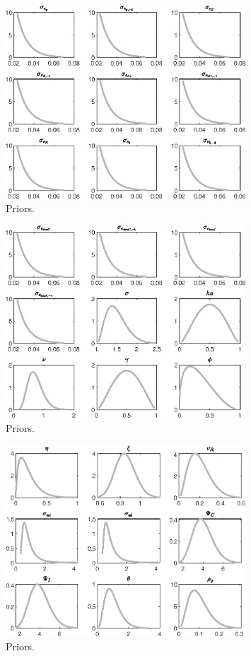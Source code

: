  
\begin{figure}[H]
\centering
\includegraphics[width=0.80\textwidth]{BRS_sectoral_KK/graphs/BRS_sectoral_KK_Priors1}
\caption{Priors.}\label{Fig:Priors:1}
\end{figure}
\begin{figure}[H]
\centering
\includegraphics[width=0.80\textwidth]{BRS_sectoral_KK/graphs/BRS_sectoral_KK_Priors2}
\caption{Priors.}\label{Fig:Priors:2}
\end{figure}
\begin{figure}[H]
\centering
\includegraphics[width=0.80\textwidth]{BRS_sectoral_KK/graphs/BRS_sectoral_KK_Priors3}
\caption{Priors.}\label{Fig:Priors:3}
\end{figure}
